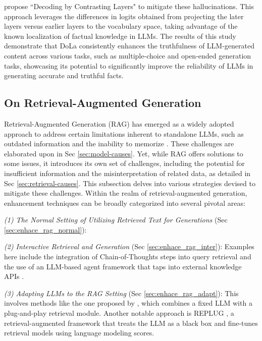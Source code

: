 \citet{chuang2023dola}  propose ``Decoding by Contrasting Layers" to mitigate these hallucinations. This approach leverages the differences in logits obtained from projecting the later layers versus earlier layers to the vocabulary space, taking advantage of the known localization of factual knowledge in LLMs. The results of this study demonstrate that DoLa consistently enhances the truthfulness of LLM-generated content across various tasks, such as multiple-choice and open-ended generation tasks, showcasing its potential to significantly improve the reliability of LLMs in generating accurate and truthful facts.

\subsection{On Retrieval-Augmented Generation}
\label{sec:enhace_rag}

Retrieval-Augmented Generation (RAG) has emerged as a widely adopted approach to address certain limitations inherent to standalone LLMs, such as outdated information and the inability to memorize \citep{LlamaIndex,LangChain}. These challenges are elaborated upon in Sec \ref{sec:model-causes}. Yet, while RAG offers solutions to some issues, it introduces its own set of challenges, including the potential for insufficient information and the misinterpretation of related data, as detailed in Sec \ref{sec:retrieval-causes}. This subsection delves into various strategies devised to mitigate these challenges. Within the realm of retrieval-augmented generation, enhancement techniques can be broadly categorized into several pivotal areas:

\emph{(1)
The Normal Setting of Utilizing Retrieved Text for Generations} (Sec \ref{sec:enhace_rag_normal}):

\emph{(2)
Interactive Retrieval and Generation} (Sec \ref{sec:enhace_rag_inter}):
Examples here include the integration of Chain-of-Thoughts steps into query retrieval \citep{he2022rethinking} and the use of an LLM-based agent framework that taps into external knowledge APIs \citep{yao2023react}.

\emph{(3)
Adapting LLMs to the RAG Setting} (Sec \ref{sec:enhace_rag_adapt}):
This involves methods like the one proposed by \citet{peng2023check}, which combines a fixed LLM with a plug-and-play retrieval module. Another notable approach is REPLUG \citep{REPLUG}, a retrieval-augmented framework that treats the LLM as a black box and fine-tunes retrieval models using language modeling scores.

